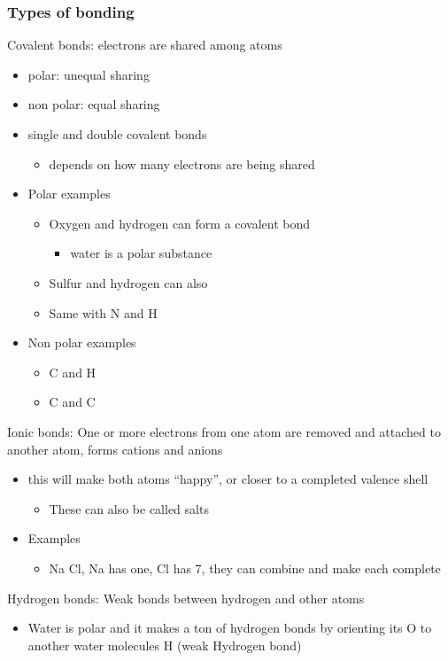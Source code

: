 \documentclass[11pt]{article}
\begin{document}
\subsubsection{Types of bonding}
\label{sec:org82c99dd}
Covalent bonds: electrons are shared among atoms
\begin{itemize}
\item polar: unequal sharing
\item non polar: equal sharing
\item single and double covalent bonds
\begin{itemize}
\item depends on how many electrons are being shared
\end{itemize}
\item Polar examples
\begin{itemize}
\item Oxygen and hydrogen can form a covalent bond
\begin{itemize}
\item water is a polar substance
\end{itemize}
\item Sulfur and hydrogen can also
\item Same with N and H
\end{itemize}
\item Non polar examples
\begin{itemize}
\item C and H
\item C and C
\end{itemize}
\end{itemize}
Ionic bonds: One or more electrons from one atom are removed and attached to another atom, forms cations and anions
\begin{itemize}
\item this will make both atoms ``happy'', or closer to a completed valence shell
\begin{itemize}
\item These can also be called salts
\end{itemize}
\item Examples
\begin{itemize}
\item Na Cl, Na has one, Cl has 7, they can combine and make each complete
\end{itemize}
\end{itemize}
Hydrogen bonds: Weak bonds between hydrogen and other atoms
\begin{itemize}
\item Water is polar and it makes a ton of hydrogen bonds by orienting its O to another water molecules H (weak Hydrogen bond)
\end{itemize}
\end{document}
